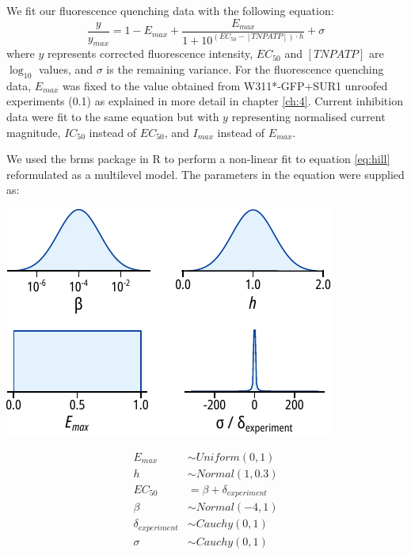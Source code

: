 We fit our fluorescence quenching data with the following equation:
\begin{equation} \label{eq:hill}
    \frac{y}{y_{max}} = 1 - E_{max} + \frac{E_{max}}{1 + 10^{(EC_{50} - [TNPATP]) \cdot h}} + \sigma
\end{equation}
where $y$ represents corrected fluorescence intensity, $EC_{50}$ and $[TNPATP]$ are $\log_{10}$ values, and $\sigma$ is the remaining variance.
For the fluorescence quenching data, $E_{max}$ was fixed to the value obtained from W311*-GFP+SUR1 unroofed experiments (0.1) as explained in more detail in chapter \ref{ch:4}.
Current inhibition data were fit to the same equation but with $y$ representing normalised current magnitude, $IC_{50}$ instead of $EC_{50}$, and $I_{max}$ instead of $E_{max}$.

We used the brms package in R to perform a non-linear fit to equation \ref{eq:hill} reformulated as a multilevel model.
The parameters in the equation were supplied as:

\begin{minipage}{.5\textwidth}
\centering
\includegraphics[width=\textwidth]{drc_priors.pdf}
\end{minipage}
\begin{minipage}{.5\textwidth}
\centering
\begin{equation} \label{eq:drc_priors}
\begin{split}
E_{max} &\sim Uniform(0, 1) \\
h &\sim Normal(1, 0.3) \\
EC_{50} &= \beta + \delta_{experiment} \\
\beta &\sim Normal(-4, 1) \\
\delta_{experiment} &\sim Cauchy(0, 1) \\
\sigma &\sim Cauchy(0, 1)
\end{split}
\end{equation}
\end{minipage}

